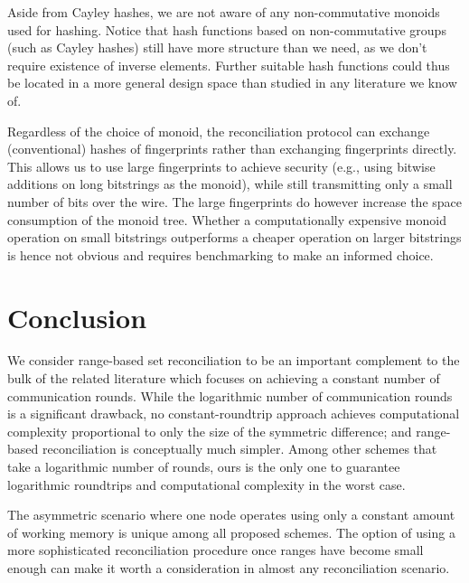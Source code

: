 \documentclass[conference]{IEEEtran}
\begin{document}

Aside from Cayley hashes, we are not aware of any non-commutative monoids used for hashing. Notice that hash functions based on non-commutative groups (such as Cayley hashes) still have more structure than we need, as we don't require existence of inverse elements. Further suitable hash functions could thus be located in a more general design space than studied in any literature we know of.

Regardless of the choice of monoid, the reconciliation protocol can exchange (conventional) hashes of fingerprints rather than exchanging fingerprints directly. This allows us to use large fingerprints to achieve security (e.g., using bitwise additions on long bitstrings as the monoid), while still transmitting only a small number of bits over the wire. The large fingerprints do however increase the space consumption of the monoid tree. Whether a computationally expensive monoid operation on small bitstrings outperforms a cheaper operation on larger bitstrings is hence not obvious and requires benchmarking to make an informed choice.

\section{Conclusion}\label{conclusion}

We consider range-based set reconciliation to be an important complement to the bulk of the related literature which focuses on achieving a constant number of communication rounds. While the logarithmic number of communication rounds is a significant drawback, no constant-roundtrip approach achieves computational complexity proportional to only the size of the symmetric difference; and range-based reconciliation is conceptually much simpler. Among other schemes that take a logarithmic number of rounds, ours is the only one to guarantee logarithmic roundtrips and computational complexity in the worst case.

The asymmetric scenario where one node operates using only a constant amount of working memory is unique among all proposed schemes. The option of using a more sophisticated reconciliation procedure once ranges have become small enough can make it worth a consideration in almost any reconciliation scenario.
\end{document}
